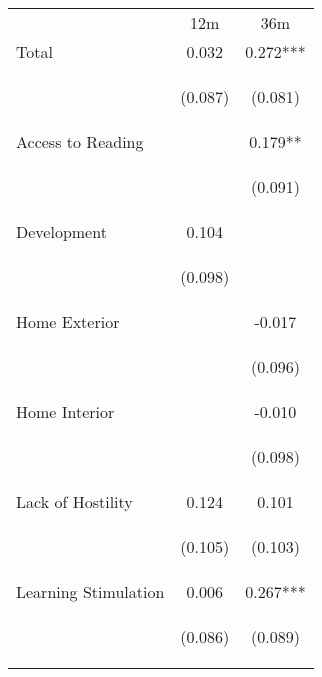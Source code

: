 \begin{tabular}{lcc}
\hline \noalign{\smallskip} & 12m & 36m\\
\noalign{\smallskip}\hline \noalign{\smallskip}Total & 0.032 & 0.272***\\
 & \begin{footnotesize}(0.087)\end{footnotesize} & \begin{footnotesize}(0.081)\end{footnotesize}\\
\noalign{\smallskip}Access to Reading &  & 0.179**\\
 & \begin{footnotesize}\end{footnotesize} & \begin{footnotesize}(0.091)\end{footnotesize}\\
\noalign{\smallskip}Development & 0.104 & \\
 & \begin{footnotesize}(0.098)\end{footnotesize} & \begin{footnotesize}\end{footnotesize}\\
\noalign{\smallskip}Home Exterior &  & -0.017\\
 & \begin{footnotesize}\end{footnotesize} & \begin{footnotesize}(0.096)\end{footnotesize}\\
\noalign{\smallskip}Home Interior &  & -0.010\\
 & \begin{footnotesize}\end{footnotesize} & \begin{footnotesize}(0.098)\end{footnotesize}\\
\noalign{\smallskip}Lack of Hostility & 0.124 & 0.101\\
 & \begin{footnotesize}(0.105)\end{footnotesize} & \begin{footnotesize}(0.103)\end{footnotesize}\\
\noalign{\smallskip}Learning Stimulation & 0.006 & 0.267***\\
 & \begin{footnotesize}(0.086)\end{footnotesize} & \begin{footnotesize}(0.089)\end{footnotesize}\\

\end{tabular}
